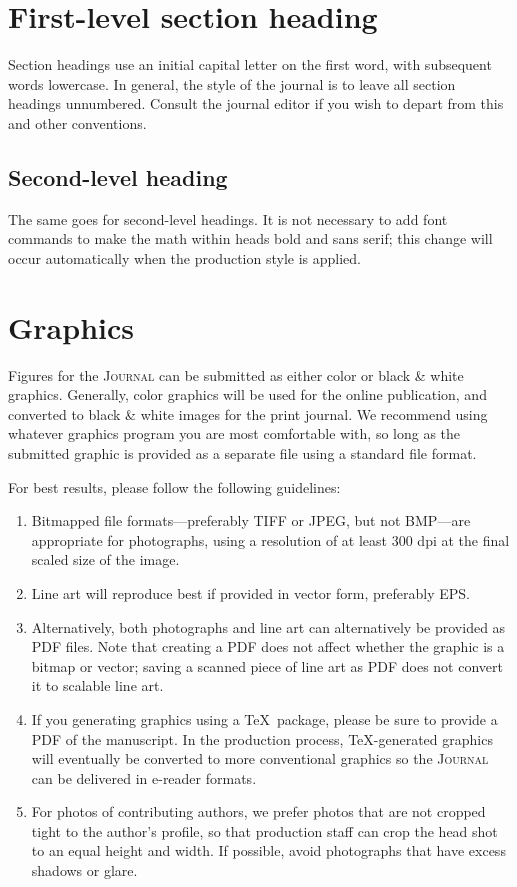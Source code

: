 \documentclass{article}
\theoremstyle{theorem}
\theoremstyle{definition}
\begin{document}
\section{First-level section heading}

Section headings use an initial capital letter on the first word, with subsequent words lowercase.  In general, the style of the journal is to leave all section headings unnumbered.  Consult the journal editor if you wish to depart from this and other conventions.

\subsection{Second-level heading}

The same goes for second-level headings.  It is not necessary to add font commands to make the math within heads bold and sans serif; this change will occur automatically when the production style is applied.

\section{Graphics}

Figures for the \textsc{Journal} can be submitted as either color or black \& white graphics.  Generally, color graphics will be used for the online publication, and converted to black \& white images for the print journal.  We recommend using whatever graphics program you are most comfortable with, so long as the submitted graphic is provided as a separate file using a standard file format.

For best results, please follow the following guidelines:
\begin{enumerate}
\item Bitmapped file formats---preferably TIFF or JPEG, but not BMP---are appropriate for photographs, using a resolution of at least 300 dpi at the final scaled size of the image.
\item Line art will reproduce best if provided in vector form, preferably EPS.
\item Alternatively, both photographs and line art can alternatively be provided as PDF files.  Note that creating a PDF does not affect whether the graphic is a bitmap or vector; saving a scanned piece of line art as PDF does not convert it to scalable line art.
\item If you generating graphics using a \TeX\ package, please be sure to provide a PDF of the manuscript.  In the production process, \TeX-generated graphics will eventually be converted to more conventional graphics so the \textsc{Journal} can be delivered in e-reader formats.
\item For photos of contributing authors, we prefer photos that are not cropped tight to the author's profile, so that production staff can crop the head shot to an equal height and width.  If possible, avoid photographs that have excess shadows or glare.
\end{enumerate}
\end{document}
